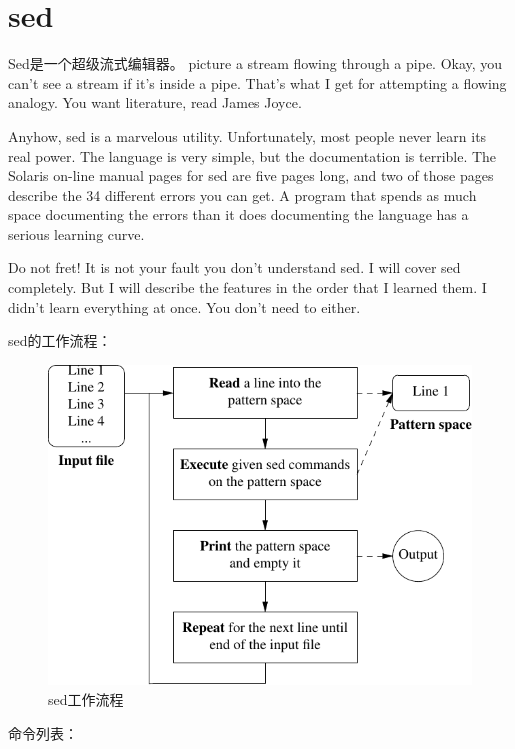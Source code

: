 \section{sed}
\label{sec:sed}

Sed是一个超级流式编辑器。
picture a stream flowing through a pipe. Okay, you can't see a stream
if it's inside a pipe. That's what I get for attempting a flowing
analogy. You want literature, read James Joyce.

Anyhow, sed is a marvelous utility. Unfortunately, most people never
learn its real power. The language is very simple, but the
documentation is terrible. The Solaris on-line manual pages for sed
are five pages long, and two of those pages describe the 34 different
errors you can get. A program that spends as much space documenting
the errors than it does documenting the language has a serious
learning curve.

Do not fret! It is not your fault you don't understand sed. I will
cover sed completely. But I will describe the features in the order
that I learned them. I didn't learn everything at once. You don't need
to either.

sed的工作流程：
\begin{figure}[!htbp]
  \centering
  \includegraphics[width=.65\textwidth]{graph/sed_workflow.pdf}
    \caption{sed工作流程}
  \label{fig:sed_workflow}
\end{figure}

命令列表：


